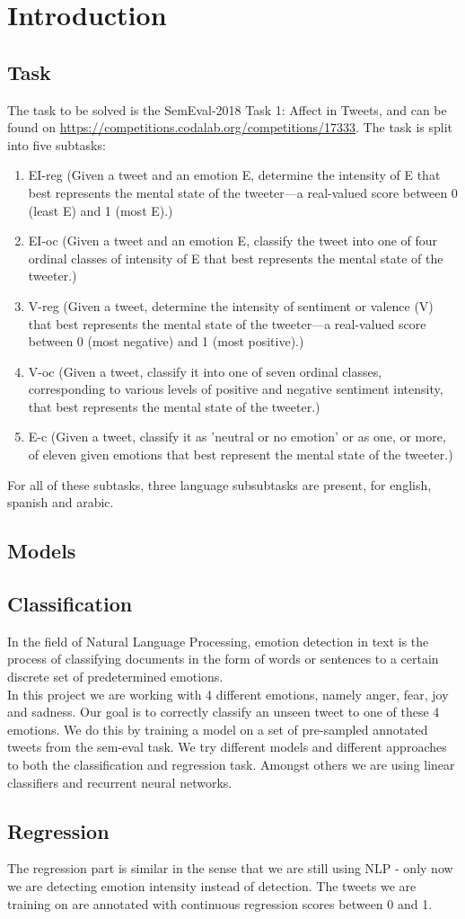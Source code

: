 \section{Introduction}
 
\subsection{Task}
The task to be solved is the SemEval-2018 Task 1: Affect in Tweets, and can be found on \hyperref[https://competitions.codalab.org/competitions/17333]{https://competitions.codalab.org/competitions/17333}. The task is split into five subtasks:\\
\begin{enumerate}
\item EI-reg (Given a tweet and an emotion E, determine the  intensity of E that best represents the mental state of the tweeter—a real-valued score between 0 (least E) and 1 (most E).)
\item EI-oc (Given a tweet and an emotion E, classify the tweet into one of four ordinal classes of intensity of E that best represents the mental state of the tweeter.)
\item V-reg (Given a tweet, determine the intensity of sentiment or valence (V) that best represents the mental state of the tweeter—a real-valued score between 0 (most negative) and 1 (most positive).)
\item V-oc (Given a tweet, classify it into one of seven ordinal classes, corresponding to various levels of positive and negative sentiment intensity, that best represents the mental state of the tweeter.)
\item E-c (Given a tweet, classify it as 'neutral or no emotion' or as one, or more, of eleven given emotions that best represent the mental state of the tweeter.)
\end{enumerate}
 
 For all of these subtasks, three language subsubtasks are present, for english, spanish and arabic.\\
 
\subsection{Models}		
\subsection{Classification}		
In the field of Natural Language Processing, emotion detection in text is the process of classifying documents in the form of words or sentences to a certain discrete set of predetermined emotions. \\		
In this project we are working with 4 different emotions, namely anger, fear, joy and sadness. Our goal is to correctly classify an unseen tweet to one of these 4 emotions. We do this by training a model on a set of pre-sampled annotated tweets from the sem-eval task. We try different models and different approaches to both the classification and regression task. Amongst others we are using linear classifiers and recurrent neural networks.		
\subsection{Regression}		
The regression part is similar in the sense that we are still using NLP - only now we are detecting emotion intensity instead of detection. The tweets we are training on are annotated with continuous regression scores between 0 and 1.
